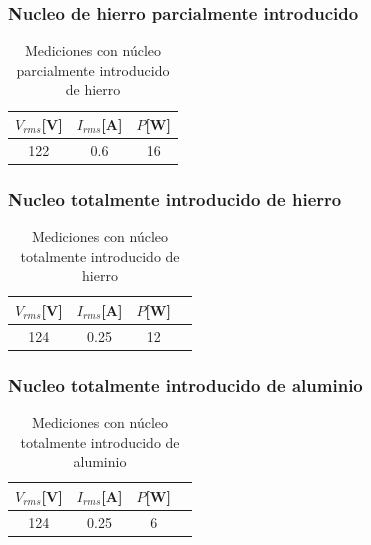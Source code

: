 \documentclass{article}
\begin{document}
        \subsubsection{Nucleo de hierro parcialmente introducido}

        \begin{table}[H]
            \centering
            \begin{tabular}{|c|c|c|}
                \hline
                $V_{rms} $[V] & $I_{rms} $[A] & $P $[W] \\ \hline
                122           & 0.6         & 16    \\ \hline
            \end{tabular}
            \caption{Mediciones con núcleo parcialmente introducido de hierro}
            \label{tab:mediciones-nucleo-parcialmente-introducido-hierro}
        \end{table}

        \subsubsection{Nucleo totalmente introducido de hierro}

        \begin{table}[H]
            \centering
            \begin{tabular}{|c|c|c|c|}
                \hline
                $V_{rms} $[V] & $I_{rms} $[A] & $P $[W] \\ \hline
                124           & 0.25         & 12    \\ \hline
            \end{tabular}
            \caption{Mediciones con núcleo totalmente introducido de hierro}
            \label{tab:mediciones-nucleo-totalmente-introducido-hierro}
        \end{table}

        \subsubsection{Nucleo totalmente introducido de aluminio}

        \begin{table}[H]
            \centering
            \begin{tabular}{|c|c|c|c|}
                \hline
                $V_{rms} $[V] & $I_{rms} $[A] & $P $[W] \\ \hline
                124           & 0.25         & 6    \\ \hline
            \end{tabular}
            \caption{Mediciones con núcleo totalmente introducido de aluminio}
            \label{tab:mediciones-nucleo-totalmente-introducido-aluminio}
        \end{table}
\end{document}
